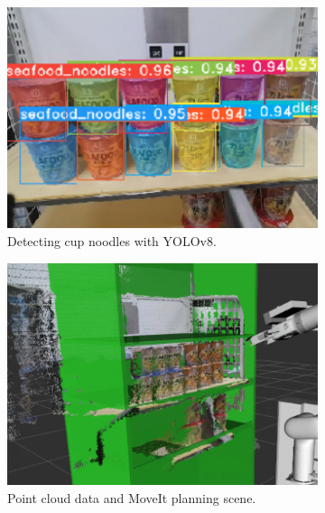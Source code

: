\documentclass[runningheads,a4paper]{llncs}
\begin{document}
\begin{figure}[tbp]
	\centering
	\begin{subfigure}[t]{0.32\linewidth}
		\includegraphics[width=1.0\linewidth]{images/object_detection_pipeline1.png}
		\caption{Detecting cup noodles with YOLOv8.}
		\label{fig:object_detection_pipeline1}
	\end{subfigure}
	\begin{subfigure}[t]{0.32\linewidth}
		\includegraphics[width=1.0\linewidth]{images/object_detection_pipeline2.png}
		\caption{Point cloud data and MoveIt planning scene.}
		\label{fig:object_detection_pipeline2}
	\end{subfigure}
	\begin{subfigure}[t]{0.32\linewidth}

\end{subfigure}
\end{figure}
\end{document}
